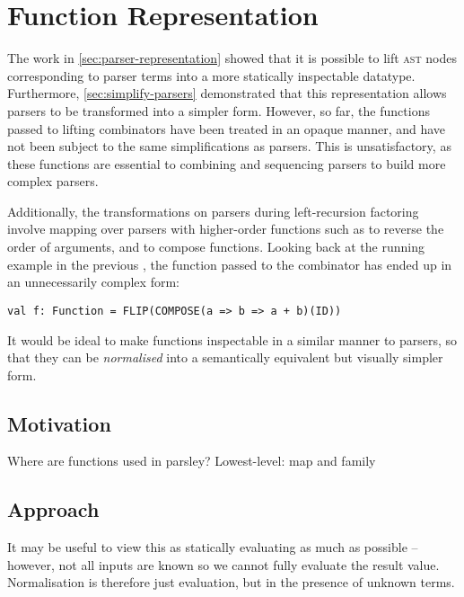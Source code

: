 \documentclass[../../main.tex]{subfiles}
\begin{document}
\section{Function Representation}\label{sec:function-representation}

The work in \cref{sec:parser-representation} showed that it is possible to lift \textsc{ast} nodes corresponding to parser terms into a more statically inspectable  datatype.
Furthermore, \cref{sec:simplify-parsers} demonstrated that this representation allows parsers to be transformed into a simpler form.
However, so far, the functions passed to lifting combinators have been treated in an opaque manner, and have not been subject to the same simplifications as parsers.
This is unsatisfactory, as these functions are essential to combining and sequencing parsers to build more complex parsers.

Additionally, the transformations on parsers during left-recursion factoring involve mapping over parsers with higher-order functions such as  to reverse the order of arguments, and  to compose functions.
Looking back at the running example in the previous , the function passed to the  combinator has ended up in an unnecessarily complex form:
\begin{verbatim}
val f: Function = FLIP(COMPOSE(a => b => a + b)(ID))
\end{verbatim}
It would be ideal to make functions inspectable in a similar manner to parsers, so that they can be \emph{normalised} into a semantically equivalent but visually simpler form.

\subsection{Motivation}
Where are functions used in parsley?
Lowest-level: map and family

\subsection{Approach}

It may be useful to view this as statically evaluating as much as possible -- however, not all inputs are known so we cannot fully evaluate the result value.
Normalisation is therefore just evaluation, but in the presence of unknown terms.
\end{document}
